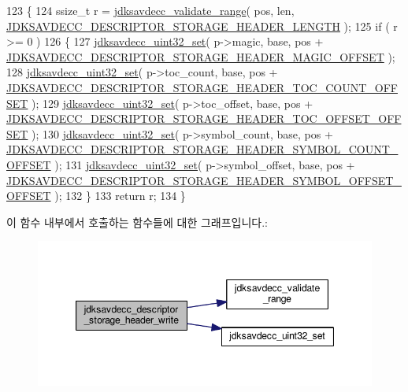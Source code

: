\begin{DoxyCode}
123 \{
124     ssize\_t r = \hyperlink{group__util_ga9c02bdfe76c69163647c3196db7a73a1}{jdksavdecc\_validate\_range}( pos, len, 
      \hyperlink{group__descriptor__storage__header_ga40ba715ff2f7643324bcd41822d75325}{JDKSAVDECC\_DESCRIPTOR\_STORAGE\_HEADER\_LENGTH} );
125     \textcolor{keywordflow}{if} ( r >= 0 )
126     \{
127         \hyperlink{group__endian_ga59b24ae6f7f47ca4d24ea337543162bf}{jdksavdecc\_uint32\_set}( p->magic, base, pos + 
      \hyperlink{group__descriptor__storage__header_ga99b64877253801c44997944b1c951f29}{JDKSAVDECC\_DESCRIPTOR\_STORAGE\_HEADER\_MAGIC\_OFFSET} );
128         \hyperlink{group__endian_ga59b24ae6f7f47ca4d24ea337543162bf}{jdksavdecc\_uint32\_set}( p->toc\_count, base, pos + 
      \hyperlink{group__descriptor__storage__header_gaffb871a86e925cd3423153984e3fe2b8}{JDKSAVDECC\_DESCRIPTOR\_STORAGE\_HEADER\_TOC\_COUNT\_OFFSET} 
      );
129         \hyperlink{group__endian_ga59b24ae6f7f47ca4d24ea337543162bf}{jdksavdecc\_uint32\_set}( p->toc\_offset, base, pos + 
      \hyperlink{group__descriptor__storage__header_gaf5771f5dc02e8b63d9152c2421859775}{JDKSAVDECC\_DESCRIPTOR\_STORAGE\_HEADER\_TOC\_OFFSET\_OFFSET}
       );
130         \hyperlink{group__endian_ga59b24ae6f7f47ca4d24ea337543162bf}{jdksavdecc\_uint32\_set}( p->symbol\_count, base, pos + 
      \hyperlink{group__descriptor__storage__header_ga8f599a40045785cffa37c361f8653e54}{JDKSAVDECC\_DESCRIPTOR\_STORAGE\_HEADER\_SYMBOL\_COUNT\_OFFSET}
       );
131         \hyperlink{group__endian_ga59b24ae6f7f47ca4d24ea337543162bf}{jdksavdecc\_uint32\_set}( p->symbol\_offset, base, pos + 
      \hyperlink{group__descriptor__storage__header_gabc3e6fbd3eea04b517b3bca6256ff67f}{JDKSAVDECC\_DESCRIPTOR\_STORAGE\_HEADER\_SYMBOL\_OFFSET\_OFFSET}
       );
132     \}
133     \textcolor{keywordflow}{return} r;
134 \}
\end{DoxyCode}


이 함수 내부에서 호출하는 함수들에 대한 그래프입니다.\+:
\nopagebreak
\begin{figure}[H]
\begin{center}
\leavevmode
\includegraphics[width=347pt]{group__descriptor__storage__header_ga8adf8e4e8e533e3fd725d4dd4bfd5925_cgraph}
\end{center}
\end{figure}


